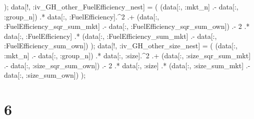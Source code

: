 \documentclass[
  letterpaper,
  DIV=11,
  numbers=noendperiod]{scrreprt}
\newenvironment{Shaded}{\begin{snugshade}}{\end{snugshade}}
\newcommand{\FloatTok}[1]{\textcolor[rgb]{0.68,0.00,0.00}{#1}}
\newcommand{\NormalTok}[1]{\textcolor[rgb]{0.00,0.23,0.31}{#1}}
\newcommand{\OperatorTok}[1]{\textcolor[rgb]{0.37,0.37,0.37}{#1}}
\begin{document}
\begin{Shaded}
\begin{Highlighting}[]
\NormalTok{);}
\NormalTok{data[!, }\OperatorTok{:}\NormalTok{iv\_GH\_other\_FuelEfficiency\_nest] }\OperatorTok{=}\NormalTok{ (}
\NormalTok{    (data[}\OperatorTok{:}\NormalTok{, }\OperatorTok{:}\NormalTok{mkt\_n] }\OperatorTok{.{-}}\NormalTok{ data[}\OperatorTok{:}\NormalTok{, }\OperatorTok{:}\NormalTok{group\_n]) }\OperatorTok{.*}\NormalTok{ data[}\OperatorTok{:}\NormalTok{, }\OperatorTok{:}\NormalTok{FuelEfficiency]}\OperatorTok{.\^{}}\FloatTok{2} \OperatorTok{.+} 
\NormalTok{    (data[}\OperatorTok{:}\NormalTok{, }\OperatorTok{:}\NormalTok{FuelEfficiency\_sqr\_sum\_mkt] }\OperatorTok{.{-}}\NormalTok{ data[}\OperatorTok{:}\NormalTok{, }\OperatorTok{:}\NormalTok{FuelEfficiency\_sqr\_sum\_own]) }\OperatorTok{.{-}} 
    \FloatTok{2} \OperatorTok{.*}\NormalTok{ data[}\OperatorTok{:}\NormalTok{, }\OperatorTok{:}\NormalTok{FuelEfficiency] }\OperatorTok{.*}\NormalTok{ (data[}\OperatorTok{:}\NormalTok{, }\OperatorTok{:}\NormalTok{FuelEfficiency\_sum\_mkt] }\OperatorTok{.{-}}\NormalTok{ data[}\OperatorTok{:}\NormalTok{, }\OperatorTok{:}\NormalTok{FuelEfficiency\_sum\_own])}
\NormalTok{);}
\NormalTok{data[!, }\OperatorTok{:}\NormalTok{iv\_GH\_other\_size\_nest]           }\OperatorTok{=}\NormalTok{ (}
\NormalTok{    (data[}\OperatorTok{:}\NormalTok{, }\OperatorTok{:}\NormalTok{mkt\_n] }\OperatorTok{.{-}}\NormalTok{ data[}\OperatorTok{:}\NormalTok{, }\OperatorTok{:}\NormalTok{group\_n]) }\OperatorTok{.*}\NormalTok{ data[}\OperatorTok{:}\NormalTok{, }\OperatorTok{:}\NormalTok{size]}\OperatorTok{.\^{}}\FloatTok{2} \OperatorTok{.+} 
\NormalTok{    (data[}\OperatorTok{:}\NormalTok{, }\OperatorTok{:}\NormalTok{size\_sqr\_sum\_mkt] }\OperatorTok{.{-}}\NormalTok{ data[}\OperatorTok{:}\NormalTok{, }\OperatorTok{:}\NormalTok{size\_sqr\_sum\_own]) }\OperatorTok{.{-}} 
    \FloatTok{2} \OperatorTok{.*}\NormalTok{ data[}\OperatorTok{:}\NormalTok{, }\OperatorTok{:}\NormalTok{size] }\OperatorTok{.*}\NormalTok{ (data[}\OperatorTok{:}\NormalTok{, }\OperatorTok{:}\NormalTok{size\_sum\_mkt] }\OperatorTok{.{-}}\NormalTok{ data[}\OperatorTok{:}\NormalTok{, }\OperatorTok{:}\NormalTok{size\_sum\_own])}
\NormalTok{);}
\end{Highlighting}
\end{Shaded}

\hypertarget{section-2}{%
\section{6}\label{section-2}}
\end{document}
